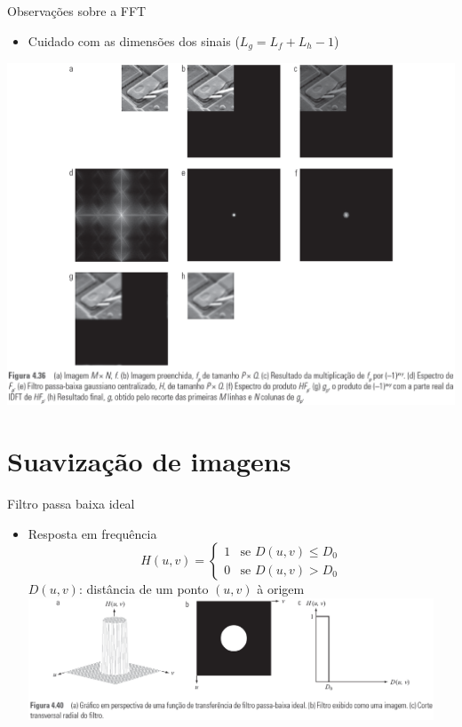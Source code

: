       \begin{slide}[toc=]{Observações sobre a FFT}
         \begin{itemize}[type=1]
            \item Cuidado com as dimensões dos sinais ($L_g = L_f+L_h -1$)
         \end{itemize}
	      \begin{center}
            \includegraphics[width=0.9\textheight]{figs/fig0436}
	      \end{center}
      \end{slide}
      
   \section[slide=true]{Suavização de imagens}
      \begin{slide}[toc=]{Filtro passa baixa ideal}
         \begin{itemize}[type=1]
            \item Resposta em frequência
            \begin{equation*}
               H(u,v) = \begin{cases}
                           1& \text{se }D(u,v)\leq D_0\\
                           0& \text{se }D(u,v)> D_0
                        \end{cases}
            \end{equation*}
            $D(u,v)$: distância de um ponto $(u,v)$ à origem
            \includegraphics[width=0.95\textwidth]{figs/fig0440}
         \end{itemize}
      \end{slide}
      
